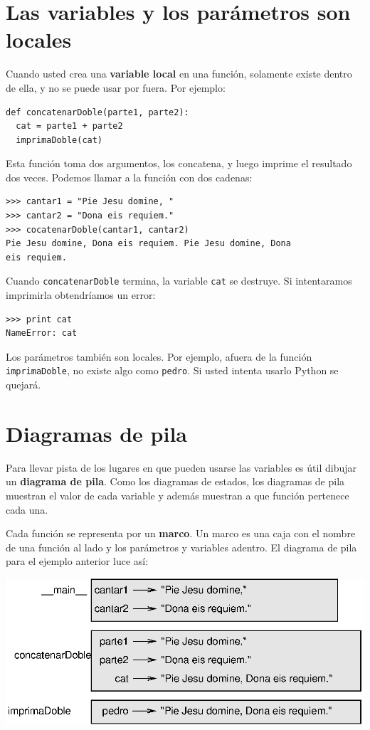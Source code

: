 \section{Las variables y los parámetros son locales}

Cuando usted crea una {\bf variable local} en una función, solamente 
existe dentro de ella, y no se puede usar por fuera. Por ejemplo:

\beforeverb
\begin{verbatim}
def concatenarDoble(parte1, parte2):
  cat = parte1 + parte2
  imprimaDoble(cat)
\end{verbatim}
\afterverb
%
Esta función toma dos argumentos, los concatena, y luego imprime el resultado
dos veces.
Podemos llamar a la función con dos cadenas:

\beforeverb
\begin{verbatim}
>>> cantar1 = "Pie Jesu domine, "
>>> cantar2 = "Dona eis requiem."
>>> cocatenarDoble(cantar1, cantar2)
Pie Jesu domine, Dona eis requiem. Pie Jesu domine, Dona 
eis requiem.
\end{verbatim}
\afterverb
%
Cuando \texttt{concatenarDoble} termina, la variable \texttt{cat} se destruye.
Si intentaramos imprimirla obtendríamos un error:

\beforeverb
\begin{verbatim}
>>> print cat
NameError: cat
\end{verbatim}
\afterverb
%
Los parámetros también son locales.
Por ejemplo, afuera de la función \texttt{imprimaDoble}, no existe
algo como \texttt{pedro}. Si usted intenta usarlo Python se quejará.


\section{Diagramas de pila}
\label{stackdiagram}

Para llevar pista de los lugares en que pueden usarse las variables
es útil dibujar un {\bf diagrama de pila}. Como los diagramas de estados,
los diagramas de pila muestran el valor de cada variable y además muestran
a que función pertenece cada una.

Cada función se representa por un {\bf marco}.  Un marco es una caja
con el nombre de una función al lado y los parámetros y variables adentro.
El diagrama de pila para el ejemplo anterior luce así:

\beforefig
\centerline{\includegraphics{illustrations/stack.eps}}
\afterfig

